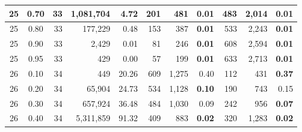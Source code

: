 \begin{table}[H]
\begin{tabular}{|c|c|r|r|r|r|r|r|r|r|r|}
        25                              & 0.70                              & 33                                     & 1,081,704                         & 4.72                              & 201           & 481              & \textbf{0.01} & 483           & 2,014            & \textbf{0.01} \\ \hline
        25                              & 0.80                              & 33                                     & 177,229                           & 0.48                              & 153           & 387              & \textbf{0.01} & 533           & 2,243            & \textbf{0.01} \\ \hline
        25                              & 0.90                              & 33                                     & 2,429                             & 0.01                              & 81            & 246              & \textbf{0.01} & 608           & 2,594            & \textbf{0.01} \\ \hline
        25                              & 0.95                              & 33                                     & 429                               & 0.00                              & 57            & 199              & \textbf{0.01} & 633           & 2,713            & \textbf{0.01} \\ \hline
        26                              & 0.10                              & 34                                     & 449                               & 20.26                             & 609           & 1,275            & 0.40          & 112           & 431              & \textbf{0.37} \\ \hline
        26                              & 0.20                              & 34                                     & 65,904                            & 24.73                             & 534           & 1,128            & \textbf{0.10} & 190           & 743              & 0.15          \\ \hline
        26                              & 0.30                              & 34                                     & 657,924                           & 36.48                             & 484           & 1,030            & 0.09          & 242           & 956              & \textbf{0.07} \\ \hline
        26                              & 0.40                              & 34                                     & 5,311,859                         & 91.32                             & 409           & 883              & \textbf{0.02} & 320           & 1,283            & \textbf{0.02} \\ \hline

\end{tabular}
\end{table}
